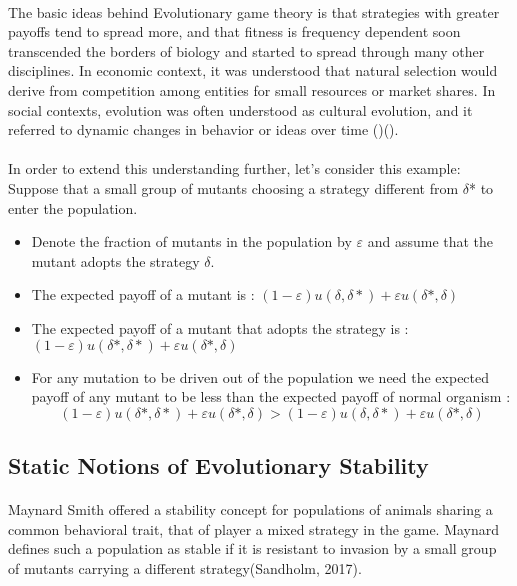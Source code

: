 \paragraph{}The basic ideas behind Evolutionary game theory is that strategies with greater payoffs tend to spread more, and that fitness is frequency dependent soon transcended the borders of biology and started to spread through many other disciplines. In economic context, it was understood that natural selection would derive from competition among entities for small resources or market shares. In social contexts, evolution was often understood as cultural evolution, and it referred to dynamic changes in behavior or ideas over time (\cite{Nelson and Winter, 1982})(\cite{Boyd and Richerson, 1985}).
\paragraph{}In order to extend this understanding further, let's consider this example:
Suppose that a small group of mutants choosing a strategy different from $\delta$* to enter the population.
\begin{itemize}
\item Denote the fraction of mutants in the population by $\varepsilon$ and assume that the mutant adopts the strategy $\delta$.
\item The expected payoff of a mutant is : 
	$(1-\varepsilon)u(\delta,\delta*)+\varepsilon u(\delta*,\delta)$
\item The expected payoff of a mutant that adopts the strategy is :	\\
	$(1-\varepsilon)u(\delta*,\delta*)+\varepsilon u(\delta*,\delta)$
	\item For any mutation to be driven out of the population we need the expected payoff of any mutant to be less than the expected payoff of normal organism :\\
	\begin{equation}(1-\varepsilon)u(\delta*,\delta*)+\varepsilon u(\delta*,\delta) > (1-\varepsilon)u(\delta,\delta*)+\varepsilon u(\delta*,\delta)  \end{equation}
\end{itemize}
\subsection{Static Notions of Evolutionary Stability}
\paragraph{}Maynard Smith offered a stability concept for populations of animals sharing a common behavioral trait, that of player a mixed strategy in  the game. Maynard defines such a population as stable if it is resistant to invasion by a small group of mutants carrying a different strategy(Sandholm, 2017).
